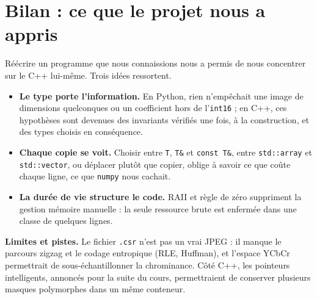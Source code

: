 \documentclass[10pt,a4paper]{article}
\newcommand{\code}[1]{\texttt{#1}}
\begin{document}
\section{Bilan : ce que le projet nous a appris}
Réécrire un programme que nous connaissions nous a permis de nous concentrer sur le C++ lui-même.
Trois idées ressortent.
\begin{itemize}
  \item \textbf{Le type porte l'information.} En Python, rien n'empêchait une image de dimensions
    quelconques ou un coefficient hors de l'\code{int16} ; en C++, ces hypothèses sont devenues des
    invariants vérifiés une fois, à la construction, et des types choisis en conséquence.
  \item \textbf{Chaque copie se voit.} Choisir entre \code{T}, \code{T\&} et \code{const T\&},
    entre \code{std::array} et \code{std::vector}, ou déplacer plutôt que copier, oblige à savoir
    ce que coûte chaque ligne, ce que \code{numpy} nous cachait.
  \item \textbf{La durée de vie structure le code.} RAII et règle de zéro suppriment la gestion
    mémoire manuelle : la seule ressource brute est enfermée dans une classe de quelques lignes.
\end{itemize}
\textbf{Limites et pistes.} Le fichier \code{.csr} n'est pas un vrai JPEG : il manque le parcours
zigzag et le codage entropique (RLE, Huffman), et l'espace YCbCr permettrait de sous-échantillonner
la chrominance. Côté C++, les pointeurs intelligents, annoncés pour la suite du cours,
permettraient de conserver plusieurs masques polymorphes dans un même conteneur.
\end{document}
